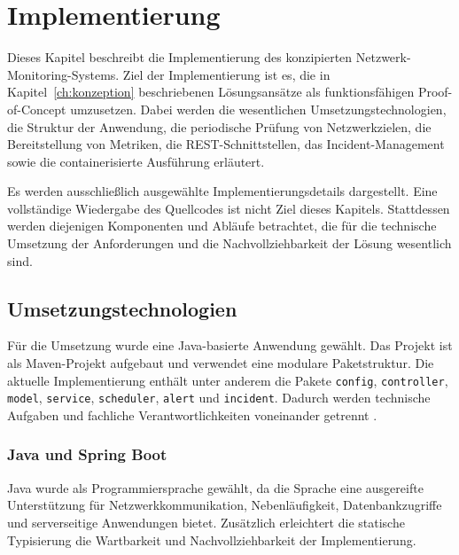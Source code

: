 \chapter{Implementierung}
\label{ch:implementierung}

Dieses Kapitel beschreibt die Implementierung des konzipierten Netzwerk-Monitoring-Systems. Ziel der Implementierung ist es, die in Kapitel~\ref{ch:konzeption} beschriebenen Lösungsansätze als funktionsfähigen Proof-of-Concept umzusetzen. Dabei werden die wesentlichen Umsetzungstechnologien, die Struktur der Anwendung, die periodische Prüfung von Netzwerkzielen, die Bereitstellung von Metriken, die REST-Schnittstellen, das Incident-Management sowie die containerisierte Ausführung erläutert.

Es werden ausschließlich ausgewählte Implementierungsdetails dargestellt. Eine vollständige Wiedergabe des Quellcodes ist nicht Ziel dieses Kapitels. Stattdessen werden diejenigen Komponenten und Abläufe betrachtet, die für die technische Umsetzung der Anforderungen und die Nachvollziehbarkeit der Lösung wesentlich sind.

\section{Umsetzungstechnologien}
\label{sec:umsetzungstechnologien}

Für die Umsetzung wurde eine Java-basierte Anwendung gewählt. Das Projekt ist als Maven-Projekt aufgebaut und verwendet eine modulare Paketstruktur. Die aktuelle Implementierung enthält unter anderem die Pakete \texttt{config}, \texttt{controller}, \texttt{model}, \texttt{service}, \texttt{scheduler}, \texttt{alert} und \texttt{incident}. Dadurch werden technische Aufgaben und fachliche Verantwortlichkeiten voneinander getrennt \cite{projekt-repository}.

\subsection{Java und Spring Boot}
\label{subsec:java-spring-boot}

Java wurde als Programmiersprache gewählt, da die Sprache eine ausgereifte Unterstützung für Netzwerkkommunikation, Nebenläufigkeit, Datenbankzugriffe und serverseitige Anwendungen bietet. Zusätzlich erleichtert die statische Typisierung die Wartbarkeit und Nachvollziehbarkeit der Implementierung.

